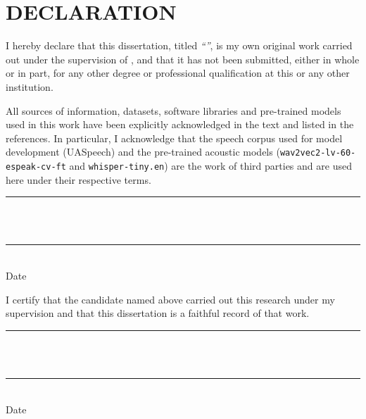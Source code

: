 \chapter*{DECLARATION}

I hereby declare that this dissertation, titled \emph{``\thesisTitle''}, is my
own original work carried out under the supervision of \supervisorName, and
that it has not been submitted, either in whole or in part, for any other
degree or professional qualification at this or any other institution.

All sources of information, datasets, software libraries and pre-trained models
used in this work have been explicitly acknowledged in the text and listed in
the references. In particular, I acknowledge that the speech corpus used for
model development (UASpeech) and the pre-trained acoustic models
(\texttt{wav2vec2-lv-60-espeak-cv-ft} and \texttt{whisper-tiny.en}) are the work
of third parties and are used here under their respective terms.

\vspace{2.2cm}

\noindent
\begin{minipage}[t]{0.55\textwidth}
\rule{6cm}{0.4pt}\\
\authorName\\
\authorIndexNo
\end{minipage}%
\begin{minipage}[t]{0.4\textwidth}
\rule{4cm}{0.4pt}\\
Date
\end{minipage}

\vspace{2.4cm}

I certify that the candidate named above carried out this research under my
supervision and that this dissertation is a faithful record of that work.

\vspace{2.2cm}

\noindent
\begin{minipage}[t]{0.55\textwidth}
\rule{6cm}{0.4pt}\\
\supervisorName\\
\supervisorTitle
\end{minipage}%
\begin{minipage}[t]{0.4\textwidth}
\rule{4cm}{0.4pt}\\
Date
\end{minipage}

\clearpage
